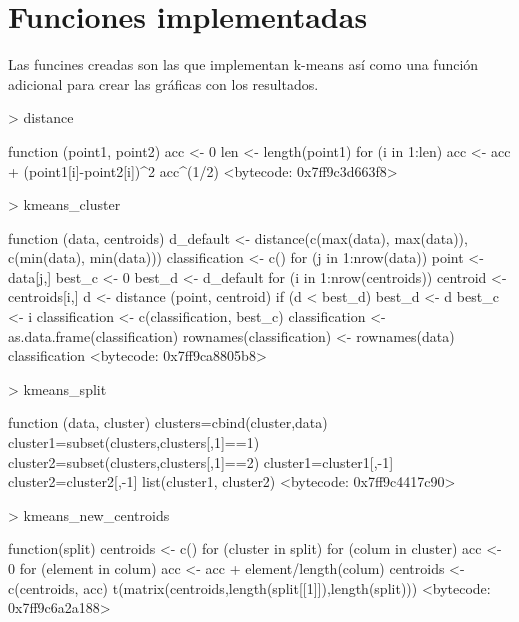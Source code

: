 \documentclass [a4paper] {article}
\begin{document}
\newpage
\section{Funciones implementadas}
Las funcines creadas son las que implementan k-means así como una función adicional para crear las gráficas con los resultados.
\begin{Schunk}
\begin{Sinput}
> distance
\end{Sinput}
\begin{Soutput}
function (point1, point2) {
  acc <- 0
  len <- length(point1)
  for (i in 1:len){
    acc <- acc + (point1[i]-point2[i])^2
  }
  acc^(1/2)
}
<bytecode: 0x7ff9c3d663f8>
\end{Soutput}
\begin{Sinput}
> kmeans_cluster
\end{Sinput}
\begin{Soutput}
function (data, centroids) {
  d_default <- distance(c(max(data), max(data)), c(min(data), min(data)))
  classification <- c()
  for (j in 1:nrow(data)){
      point <- data[j,]
      best_c <- 0
      best_d <- d_default
      for (i in 1:nrow(centroids)){
        centroid <- centroids[i,]
        d <- distance (point, centroid)
        if (d < best_d){
          best_d <- d
          best_c <- i
        }
    }
    classification <- c(classification, best_c)
  }
  classification <- as.data.frame(classification)
  rownames(classification) <- rownames(data)
  classification
}
<bytecode: 0x7ff9ca8805b8>
\end{Soutput}
\begin{Sinput}
> kmeans_split
\end{Sinput}
\begin{Soutput}
function (data, cluster) {
  clusters=cbind(cluster,data)
  cluster1=subset(clusters,clusters[,1]==1)
  cluster2=subset(clusters,clusters[,1]==2)
  cluster1=cluster1[,-1]
  cluster2=cluster2[,-1]
  list(cluster1, cluster2)
}
<bytecode: 0x7ff9c4417c90>
\end{Soutput}
\begin{Sinput}
> kmeans_new_centroids
\end{Sinput}
\begin{Soutput}
function(split){
  centroids <- c()
  for (cluster in split) {
    for (colum in cluster) {
      acc <- 0
      for (element in colum){
        acc <- acc + element/length(colum)
      }
      centroids <- c(centroids, acc)
    }
  }
  t(matrix(centroids,length(split[[1]]),length(split)))
}
<bytecode: 0x7ff9c6a2a188>

\end{Soutput}
\end{Schunk}
\end{document}
